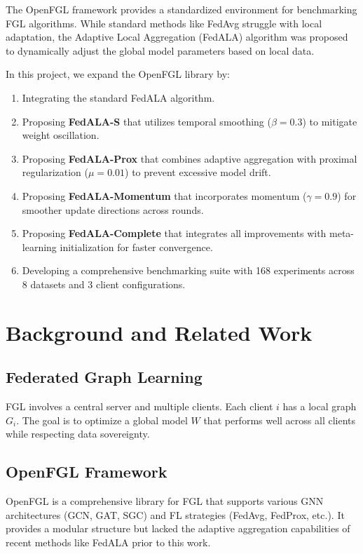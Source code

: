 \documentclass[10pt,conference,compsocconf,letterpaper]{IEEEtran}
\begin{document}
The OpenFGL framework provides a standardized environment for benchmarking FGL algorithms. While standard methods like FedAvg struggle with local adaptation, the Adaptive Local Aggregation (FedALA) algorithm was proposed to dynamically adjust the global model parameters based on local data. 

In this project, we expand the OpenFGL library by:
\begin{enumerate}
    \item Integrating the standard FedALA algorithm.
    \item Proposing \textbf{FedALA-S} that utilizes temporal smoothing ($\beta=0.3$) to mitigate weight oscillation.
    \item Proposing \textbf{FedALA-Prox} that combines adaptive aggregation with proximal regularization ($\mu=0.01$) to prevent excessive model drift.
    \item Proposing \textbf{FedALA-Momentum} that incorporates momentum ($\gamma=0.9$) for smoother update directions across rounds.
    \item Proposing \textbf{FedALA-Complete} that integrates all improvements with meta-learning initialization for faster convergence.
    \item Developing a comprehensive benchmarking suite with 168 experiments across 8 datasets and 3 client configurations.
\end{enumerate}

\section{Background and Related Work}
\subsection{Federated Graph Learning}
FGL involves a central server and multiple clients. Each client $i$ has a local graph $G_i$. The goal is to optimize a global model $W$ that performs well across all clients while respecting data sovereignty.

\subsection{OpenFGL Framework}
OpenFGL is a comprehensive library for FGL that supports various GNN architectures (GCN, GAT, SGC) and FL strategies (FedAvg, FedProx, etc.). It provides a modular structure but lacked the adaptive aggregation capabilities of recent methods like FedALA prior to this work.
\end{document}
